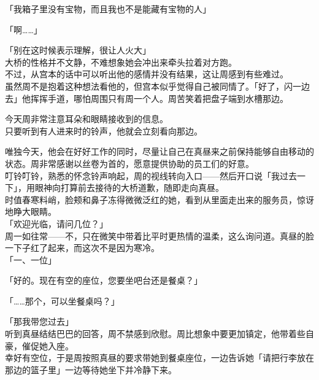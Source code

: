 「我箱子里没有宝物，而且我也不是能藏有宝物的人」

「啊……」

「别在这时候表示理解，很让人火大」\\

大桥的性格并不文静，不难想象她会冲出来牵头拉着对方跑。\\

不过，从宫本的话中可以听出他的感情并没有结果，这让周感到有些难过。\\

虽然周不是抱着这种想法看他的，但宫本似乎觉得自己被同情了。「好了，闪一边去」他挥挥手道，哪怕周围只有周一个人。周苦笑着把盘子端到水槽那边。\\

\vspace{2\baselineskip}

今天周非常注意耳朵和眼睛接收到的信息。\\

只要听到有人进来时的铃声，他就会立刻看向那边。

唯独今天，他会在好好工作的同时，尽量让自己在真昼来之前保持能够自由移动的状态。周非常感谢以丝卷为首的，愿意提供协助的员工们的好意。\\

叮铃叮铃，熟悉的怀念铃声响起，周的视线转向入口——然后开口说「我过去一下」，用眼神向打算前去接待的大桥道歉，随即走向真昼。\\

时值春寒料峭，脸颊和鼻子冻得微微泛红的她，看到从里面走出来的服务员，惊讶地睁大眼睛。\\

「欢迎光临，请问几位？」\\

周一如往常——不，只在微笑中带着比平时更热情的温柔，这么询问道。真昼的脸一下子红了起来，而这次不是因为寒冷。\\

「一、一位」

「好的。现在有空的座位，您要坐吧台还是餐桌？」

「……那个，可以坐餐桌吗？」

「那我带您过去」\\

听到真昼结结巴巴的回答，周不禁感到欣慰。周比想象中要更加镇定，他带着些自豪，催促她入座。\\

幸好有空位，于是周按照真昼的要求带她到餐桌座位，一边告诉她「请把行李放在那边的篮子里」一边等待她坐下并冷静下来。\\

